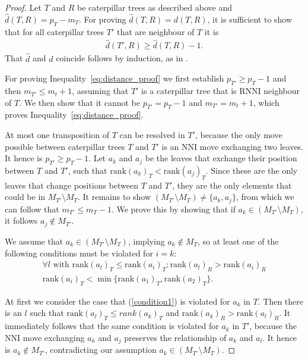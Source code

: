 \documentclass[11pt]{amsart}
\newcommand{\rnni}{\mathrm{RNNI}}
\newcommand{\rank}{\mathrm{rank}}
\newcommand{\nni}{\mathrm{NNI}}
\begin{document}
\begin{proof}
	Let $T$ and $R$ be caterpillar trees as described above and $\hat d(T,R) = p_T - m_T$.
	For proving $\hat d(T,R) = d(T,R)$, it is sufficient to show that for all caterpillar trees $T'$ that are neighbour of $T$ it is
	\begin{align}
		\hat d(T',R) \geq \hat d(T,R) - 1.
		\label{eq:distance_proof}
	\end{align}
	That $\hat d$ and $d$ coincide follows by induction, as in \autocite[Theorem 1]{Collienne2020-iu}.

	For proving Inequality~\ref{eq:distance_proof} we first establish $p_{T'} \geq p_T - 1$ and then $m_{T'} \leq m_t + 1$, assuming that $T'$ is a caterpillar tree that is $\rnni$ neighbour of $T$.
	We then show that it cannot be $p_{T'} = p_T - 1$ and $m_{T'} = m_t + 1$, which proves Inequality~\ref{eq:distance_proof}.

	At most one transposition of $T$ can be resolved in $T'$, because the only move possible between caterpillar trees $T$ and $T'$ is an $\nni$ move exchanging two leaves.
	It hence is $p_{T'} \geq p_T - 1$.
	Let $a_k$ and $a_j$ be the leaves that exchange their position between $T$ and $T'$, such that $\rank(a_k)_T < \rank(a_j)_T$.
	Since these are the only leaves that change positions between $T$ and $T'$, they are the only elements that could be in $M_{T'} \setminus M_T$.
	It remains to show $(M_{T'} \setminus M_T) \neq \{a_k, a_j\}$, from which we can follow that $m_{T'} \leq m_T - 1$.
	We prove this by showing that if $a_k \in (M_{T'} \setminus M_T)$, it follows $a_j \notin M_{T'}$.

	We assume that $a_k \in (M_{T'} \setminus M_T)$, implying $a_k \notin M_T$, so at least one of the following conditions must be violated for $i = k$:
	\setcounter{equation}{0} %
	\renewcommand{\theequation}{C\arabic{equation}}
	\begin{align}
		\forall l \text{ with } \rank(a_l)_T \leq \rank(a_i)_T: \rank(a_l)_R > \rank(a_i)_R \label{condition1}\\
		\rank(a_i)_T < \min\{\rank(a_1)_T, \rank(a_2)_T\}.
		\label{condition2}
	\end{align}
	\setcounter{equation}{1}
	\renewcommand{\theequation}{\arabic{equation}}

	At first we consider the case that (\ref{condition1}) is violated for $a_k$ in $T$.
	Then there is an $l$ such that $\rank(a_l)_T \leq rank(a_k)_T$ and $\rank(a_k)_R > \rank(a_l)_R$.
	It immediately follows that the same condition is violated for $a_k$ in $T'$, because the $\nni$ move exchanging $a_k$ and $a_j$ preserves the relationship of $a_k$ and $a_l$.
	It hence is $a_k \notin M_{T'}$, contradicting our assumption $a_k \in (M_{T'} \setminus M_T)$.


\end{proof}
\end{document}
